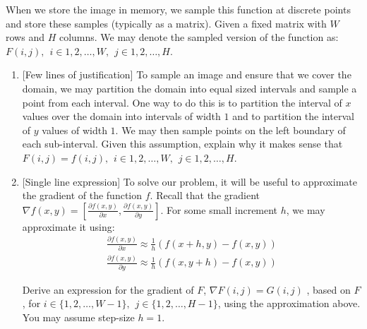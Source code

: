\newline
\newline
When we store the image in memory, we sample this function at discrete points and store these samples (typically as a matrix). Given a fixed matrix with $W$ rows and $H$ columns. We may denote the sampled version of the function as: $F(i,j), \hspace{5pt} i \in {1,2, \hdots , W}, \hspace{5pt} j\in {1,2, \hdots , H} $. 
\begin{enumerate}
    \item {[Few lines of justification]}
     To sample an image and ensure that we cover the domain, we may partition the domain into equal sized intervals and sample a point from each interval. One way to do this is to partition the interval of $x$ values over the domain into intervals of width $1$ and to partition the interval of $y$ values of width $1$. We may then sample points on the left boundary of each sub-interval. Given this assumption, explain why it makes sense that $F(i,j) = f\left( i, j\right), \hspace{5pt} i \in {1,2, \hdots , W}, \hspace{5pt} j\in {1,2, \hdots , H}$.
    \newline
    
    \sol{}
    
    \item {[Single line expression]}
    To solve our problem, it will be useful to approximate the gradient of the function $f$. Recall that the gradient $\nabla f(x,y) = \left[\frac{\partial f(x,y)}{\partial x},\frac{\partial f(x,y)}{\partial y} \right]$. For some small increment $h$, we may approximate it using:
    \begin{align*}
        \frac{\partial f(x,y)}{\partial x} \approx \frac{1}{h} (f(x+h,y) -f(x,y) ) \\
        \frac{\partial f(x,y)}{\partial y} \approx \frac{1}{h} (f(x,y+h) -f(x,y) )
    \end{align*}
    
    Derive an expression for the gradient of $F$,  $\nabla F(i,j) = G(i,j)$ , based on $F$, for  $ i \in \{1,2, \hdots , W-1 \}, \hspace{5pt} j\in \{1,2, \hdots , H-1 \}$, using the approximation above. You may assume step-size $h = 1$.
    \newline
    
    \sol{}
    

\end{enumerate}

